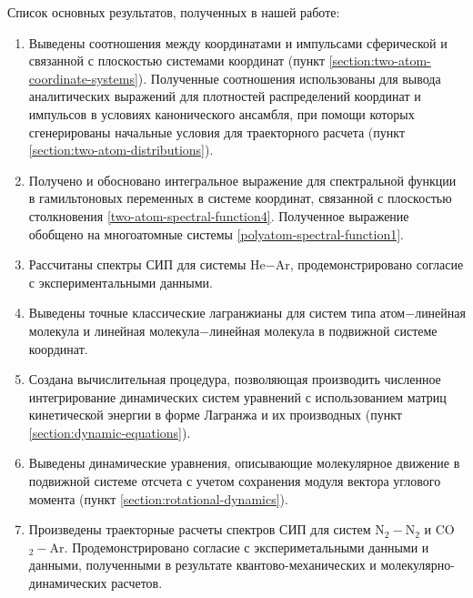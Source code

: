 Список основных результатов, полученных в нашей работе:
\begin{enumerate}
    \item Выведены соотношения между координатами и импульсами сферической и связанной с плоскостью системами координат (пункт \ref{section:two-atom-coordinate-systems}). Полученные соотношения использованы для вывода  аналитических выражений для плотностей распределений координат и импульсов в условиях канонического ансамбля, при помощи которых сгенерированы начальные условия для траекторного расчета (пункт \ref{section:two-atom-distributions}).
    \item Получено и обосновано интегральное выражение для спектральной функции в гамильтоновых переменных в системе координат, связанной с плоскостью столкновения \eqref{two-atom-spectral-function4}. Полученное выражение обобщено на многоатомные системы \eqref{polyatom-spectral-function1}. 
    \item Рассчитаны спектры СИП для системы He$-$Ar, продемонстрировано согласие с экспериментальными данными. 
    \item Выведены точные классические лагранжианы для систем типа атом$-$линейная молекула и линейная молекула$-$линейная молекула в подвижной системе координат.
    \item Создана вычислительная процедура, позволяющая производить численное интегрирование динамических систем уравнений с использованием матриц кинетической энергии в форме Лагранжа и их производных (пункт \ref{section:dynamic-equations}).
    \item Выведены динамические уравнения, описывающие молекулярное движение в подвижной системе отсчета с учетом сохранения модуля вектора углового момента (пункт \ref{section:rotational-dynamics}).
    \item Произведены траекторные расчеты спектров СИП для систем N$_2-$N$_2$ и CO$_2-$Ar. Продемонстрировано согласие с экспериметальными данными и данными, полученными в результате квантово-механических и молекулярно-динамических расчетов.
\end{enumerate}

